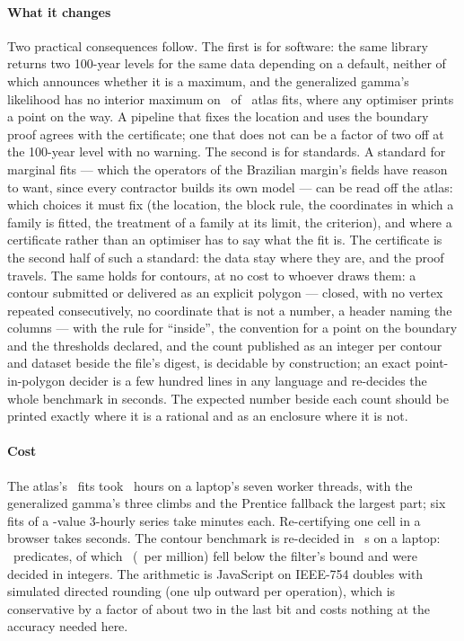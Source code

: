 \documentclass[preprint,11pt,authoryear]{elsarticle}
\begin{document}
\paragraph{What it changes}
Two practical consequences follow. The first is for software: the same library returns two 100-year levels for the same data depending on a default, neither of which announces whether it is a maximum, and the generalized gamma's likelihood has no interior maximum on \AGGLimit\ of \AFits\ atlas fits, where any optimiser prints a point on the way. A pipeline that fixes the location and uses the boundary proof agrees with the certificate; one that does not can be a factor of two off at the 100-year level with no warning. The second is for standards. A standard for marginal fits --- which the operators of the Brazilian margin's fields have reason to want, since every contractor builds its own model \citep{reis2026} --- can be read off the atlas: which choices it must fix (the location, the block rule, the coordinates in which a family is fitted, the treatment of a family at its limit, the criterion), and where a certificate rather than an optimiser has to say what the fit is. The certificate is the second half of such a standard: the data stay where they are, and the proof travels. The same holds for contours, at no cost to whoever draws them: a contour submitted or delivered as an explicit polygon --- closed, with no vertex repeated consecutively, no coordinate that is not a number, a header naming the columns --- with the rule for ``inside'', the convention for a point on the boundary and the thresholds declared, and the count published as an integer per contour and dataset beside the file's digest, is decidable by construction; an exact point-in-polygon decider is a few hundred lines in any language and re-decides the whole benchmark in seconds. The expected number beside each count should be printed exactly where it is a rational and as an enclosure where it is not.

\paragraph{Cost}
The atlas's \AFits\ fits took \ASecondsHours\ hours on a laptop's seven worker threads, with the generalized gamma's three climbs and the Prentice fallback the largest part; six fits of a \RNodeN-value 3-hourly series take minutes each. Re-certifying one cell in a browser takes seconds. The contour benchmark is re-decided in \ESeconds\ s on a laptop: \EPredicatesSci\ predicates, of which \EExactPredicates\ (\EExactPredicatesPerMillion\ per million) fell below the filter's bound and were decided in integers. The arithmetic is JavaScript on IEEE-754 doubles with simulated directed rounding (one ulp outward per operation), which is conservative by a factor of about two in the last bit and costs nothing at the accuracy needed here.
\end{document}
